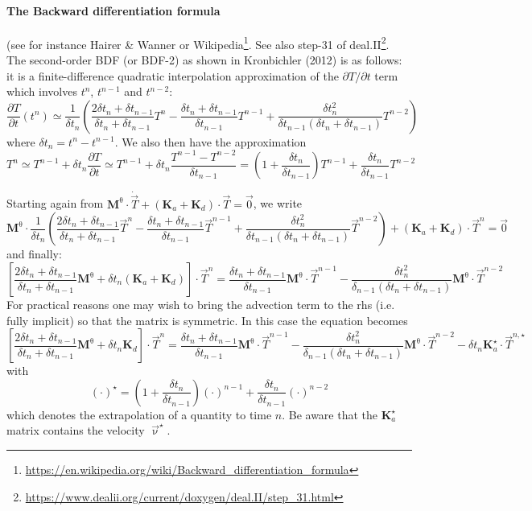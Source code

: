 \paragraph{The Backward differentiation formula} (see for instance Hairer \& Wanner \cite{hawa91} 
or Wikipedia\footnote{\url{https://en.wikipedia.org/wiki/Backward_differentiation_formula}}. 
See also step-31 of deal.II\footnote{\url{https://www.dealii.org/current/doxygen/deal.II/step_31.html}}.
The second-order BDF (or BDF-2) as shown in Kronbichler \etal (2012) \cite{krhb12} 
is as follows: it is a finite-difference 
quadratic interpolation approximation of the $\partial T/\partial t$ term which involves
$t^n$, $t^{n-1}$ and $t^{n-2}$:
\begin{equation}
\frac{\partial T}{\partial t}(t^n) \simeq
\frac{1}{\delta t_n} \left( \frac{2\delta t_n + \delta t_{n-1}}{\delta t_n+\delta t_{n-1} } T^n  
- \frac{\delta t_n +\delta t_{n-1}}{\delta t_{n-1}} T^{n-1}
+ \frac{\delta t_n^2}{\delta t_{n-1}(\delta t_n+\delta t_{n-1})} T^{n-2}
\right)
\end{equation}
where $\delta t_n=t^n-t^{n-1}$. We also then have the approximation
\[
T^n  
\simeq T^{n-1} + \delta t_n \frac{\partial T}{\partial t}
\simeq T^{n-1} + \delta t_n \frac{T^{n-1}-T^{n-2}}{\delta t_{n-1}} 
= \left(1 + \frac{\delta t_n}{\delta t_{n-1}} \right) T^{n-1} + \frac{\delta t_n}{\delta t_{n-1}} T^{n-2}
\]

Starting again from 
${\bm M}^\uptheta \cdot \dot{\vec T} + ({\bm K}_a + {\bm K}_d) \cdot \vec T = \vec 0$,
we write 
\[
{\bm M}^\uptheta \cdot 
\frac{1}{\delta t_n} \left( \frac{2\delta t_n + \delta t_{n-1}}{\delta t_n+\delta t_{n-1} } \vec T^n  
- \frac{\delta t_n +\delta t_{n-1}}{\delta t_{n-1}} \vec T^{n-1}
+ \frac{\delta t_n^2}{\delta t_{n-1}(\delta t_n+\delta t_{n-1})} \vec T^{n-2} \right)
+ ({\bm K}_a + {\bm K}_d) \cdot \vec T^n = \vec 0
\]
and finally:
\begin{equation}
\left[ \frac{2\delta t_n + \delta t_{n-1}}{\delta t_n+\delta t_{n-1} }
{\bm M}^\uptheta + \delta t_n({\bm K}_a + {\bm K}_d) \right]
 \cdot \vec T^n =
 \frac{\delta t_n +\delta t_{n-1}}{\delta t_{n-1}} {\bm M}^\uptheta \cdot \vec T^{n-1}
- \frac{\delta t_n^2}{\delta_{n-1}(\delta t_n+\delta t_{n-1})} {\bm M}^\uptheta \cdot \vec T^{n-2}
\label{eq:bdf2}
\end{equation}
For practical reasons one may wish to bring the advection term to the rhs (i.e. fully implicit)
so that the matrix is symmetric. 
In this case the equation becomes 
\[
\left[
\frac{2\delta t_n + \delta t_{n-1}}{\delta t_n+\delta t_{n-1} }
{\bm M}^\uptheta
+ \delta t_n {\bm K}_d
\right]
 \cdot \vec T^n =
 \frac{\delta t_n +\delta t_{n-1}}{\delta t_{n-1}} {\bm M}^\uptheta \cdot \vec T^{n-1}
- \frac{\delta t_n^2}{\delta_{n-1}(\delta t_n+\delta t_{n-1})} {\bm M}^\uptheta \cdot \vec T^{n-2}
- \delta t_n {\bm K}_a^\star \cdot \vec T^{n,\star} 
\]
with 
\[
(\cdot)^\star = \left(1 + \frac{\delta t_n}{\delta t_{n-1}} \right) (\cdot)^{n-1} 
+ \frac{\delta t_n}{\delta t_{n-1}} (\cdot )^{n-2}
\]
which denotes the extrapolation of a quantity to time $n$.
Be aware that the ${\bm K}_a^\star$ matrix contains the velocity $\vec\upnu^\star$.

